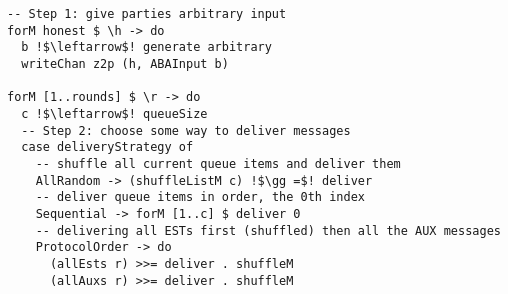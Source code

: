 \begin{lstlisting}
-- Step 1: give parties arbitrary input
forM honest $ \h -> do
  b !$\leftarrow$! generate arbitrary
  writeChan z2p (h, ABAInput b)

forM [1..rounds] $ \r -> do
  c !$\leftarrow$! queueSize
  -- Step 2: choose some way to deliver messages
  case deliveryStrategy of
  	-- shuffle all current queue items and deliver them
    AllRandom -> (shuffleListM c) !$\gg =$! deliver
	-- deliver queue items in order, the 0th index
    Sequential -> forM [1..c] $ deliver 0
	-- delivering all ESTs first (shuffled) then all the AUX messages
    ProtocolOrder -> do
      (allEsts r) >>= deliver . shuffleM
      (allAuxs r) >>= deliver . shuffleM
\end{lstlisting}

